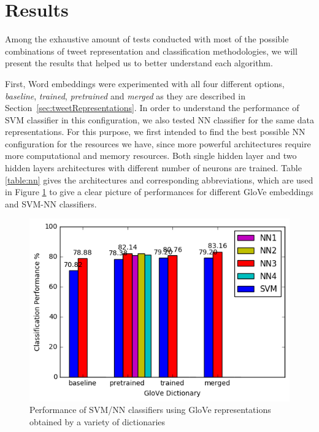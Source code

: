 \section{Results}
\label{sec:results}
Among the exhaustive amount of tests conducted with most of the possible combinations of tweet representation and classification methodologies, we will present the results that helped us to better understand each algorithm.

 


First, Word embeddings were experimented with all four different options, \textit{baseline}, \textit{trained}, \textit{pretrained} and \textit{merged} as they are described in Section~\ref{sec:tweetRepresentations}.
In order to understand the performance of SVM classifier in this configuration, we also tested NN classifier for the same data representations.
For this purpose, we first intended to find the best possible NN configuration for the resources we have, since more powerful architectures require more computational and memory resources.
Both single hidden layer and two hidden layers architectures with different number of neurons are trained.
Table \ref{table:nn} gives the architectures and corresponding abbreviations, which are used in Figure \ref{fig:perf1} to give a clear picture of performances for different GloVe embeddings and SVM-NN classifiers.



\begin{figure}[t]
	\centering
	\includegraphics[width=0.8\columnwidth]{glove_NN_SVM.png}
	\caption{Performance of SVM/NN classifiers using GloVe representations obtained by a variety of dictionaries}
	\label{fig:perf1}
\end{figure}

